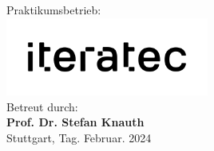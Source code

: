 \begin{titlepage}
\begin{center}
        \normalsize
        \vspace{0.8cm}
        Praktikumsbetrieb:\\ 
        \large
        \includegraphics[width=0.5\textwidth]{figures/iteratec-Logo.png}\\
        \vspace{0.3cm}
        \normalsize
        Betreut durch:\> \\ 
        \large
        \textbf{Prof. Dr. Stefan Knauth} \\
        \normalsize
        \vspace{0.5cm}
        Stuttgart, Tag. Februar. 2024\\
    \end{center}
\end{titlepage}